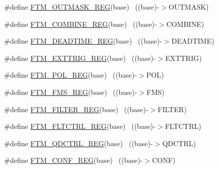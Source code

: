 \begin{DoxyCompactItemize}
\item 
\#define \hyperlink{group___f_t_m___register___accessor___macros_gaed9953404dbe94ee34e8a906489506c2}{F\+T\+M\+\_\+\+O\+U\+T\+M\+A\+S\+K\+\_\+\+R\+EG}(base)                                    ~((base)-\/$>$O\+U\+T\+M\+A\+SK)
\item 
\#define \hyperlink{group___f_t_m___register___accessor___macros_ga3bd7d4b2370ee66201e8d9e87e416da0}{F\+T\+M\+\_\+\+C\+O\+M\+B\+I\+N\+E\+\_\+\+R\+EG}(base)                                    ~((base)-\/$>$C\+O\+M\+B\+I\+NE)
\item 
\#define \hyperlink{group___f_t_m___register___accessor___macros_gafd613d2abdcb75b0dd32d3b045ee2192}{F\+T\+M\+\_\+\+D\+E\+A\+D\+T\+I\+M\+E\+\_\+\+R\+EG}(base)                                  ~((base)-\/$>$D\+E\+A\+D\+T\+I\+ME)
\item 
\#define \hyperlink{group___f_t_m___register___accessor___macros_ga471f91fbb0abe03bbbe568d75c5baa3b}{F\+T\+M\+\_\+\+E\+X\+T\+T\+R\+I\+G\+\_\+\+R\+EG}(base)                                    ~((base)-\/$>$E\+X\+T\+T\+R\+IG)
\item 
\#define \hyperlink{group___f_t_m___register___accessor___macros_ga8e78f5088a2e01b6857336a7290f20f0}{F\+T\+M\+\_\+\+P\+O\+L\+\_\+\+R\+EG}(base)                                            ~((base)-\/$>$P\+OL)
\item 
\#define \hyperlink{group___f_t_m___register___accessor___macros_ga2c28b40a38a76a870130b9cfda02ae6a}{F\+T\+M\+\_\+\+F\+M\+S\+\_\+\+R\+EG}(base)                                            ~((base)-\/$>$F\+MS)
\item 
\#define \hyperlink{group___f_t_m___register___accessor___macros_gae52e1c95a74f5562b3d840a82762fcfc}{F\+T\+M\+\_\+\+F\+I\+L\+T\+E\+R\+\_\+\+R\+EG}(base)                                      ~((base)-\/$>$F\+I\+L\+T\+ER)
\item 
\#define \hyperlink{group___f_t_m___register___accessor___macros_gab0a641159aeae9d56cb5b5353f3a68ec}{F\+T\+M\+\_\+\+F\+L\+T\+C\+T\+R\+L\+\_\+\+R\+EG}(base)                                    ~((base)-\/$>$F\+L\+T\+C\+T\+RL)
\item 
\#define \hyperlink{group___f_t_m___register___accessor___macros_ga998d62e98f702aca0c1f71e7699d5973}{F\+T\+M\+\_\+\+Q\+D\+C\+T\+R\+L\+\_\+\+R\+EG}(base)                                      ~((base)-\/$>$Q\+D\+C\+T\+RL)
\item 
\#define \hyperlink{group___f_t_m___register___accessor___macros_gaccd05c478b64606ec1ceb2ef17e38dc4}{F\+T\+M\+\_\+\+C\+O\+N\+F\+\_\+\+R\+EG}(base)                                          ~((base)-\/$>$C\+O\+NF)

\end{DoxyCompactItemize}
